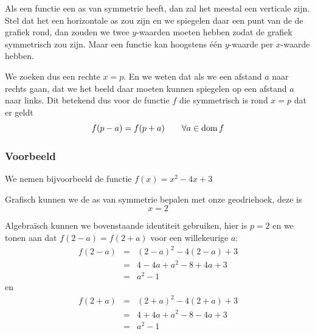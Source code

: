 \documentclass[12pt,a4paper,twoside]{article}
\begin{document}
Als een functie een as van symmetrie heeft, dan zal het meestal een verticale zijn. Stel dat het een horizontale as zou zijn en we spiegelen daar een punt van de de grafiek rond, dan zouden we twee $y$-waarden moeten hebben zodat de grafiek symmetrisch zou zijn. Maar een functie kan hoogstens één $y$-waarde per $x$-waarde hebben.

We zoeken dus een rechte $x=p$. En we weten dat als we een afstand $a$ naar rechts gaan, dat we het beeld daar moeten kunnen spiegelen op een afstand $a$ naar links. Dit betekend dus voor de functie $f$ die symmetrisch is rond $x=p$ dat er geldt
$$f(p-a)=f(p+a)\qquad\forall a\in \dom f$$

\subsubsection*{Voorbeeld}

We nemen bijvoorbeeld de functie $f(x)=x^2-4x+3$
\begin{center}
\end{center}

Grafisch kunnen we de as van symmetrie bepalen met onze geodriehoek, deze is
$$x=2$$

Algebraïsch kunnen we bovenstaande identiteit gebruiken, hier is $p=2$ en we tonen aan dat $f(2-a)=f(2+a)$ voor een willekeurige $a$:
\begin{eqnarray*}
  f(2-a) &=& (2-a)^2-4(2-a)+3\\
         &=& 4-4a+a^2-8+4a+3\\
         &=& a^2-1
\end{eqnarray*}
en
\begin{eqnarray*}
  f(2+a) &=& (2+a)^2-4(2+a)+3\\
         &=& 4+4a+a^2-8-4a+3\\
         &=& a^2-1
\end{eqnarray*}
\end{document}
